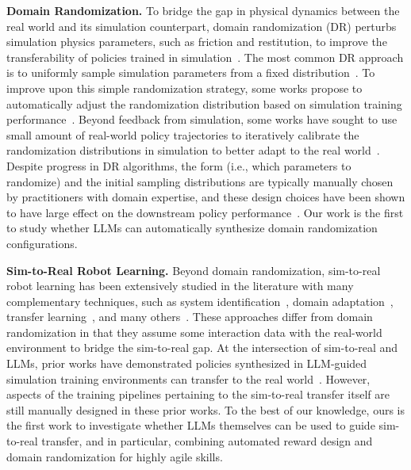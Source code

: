 \documentclass[conference]{IEEEtran}
\begin{document}
\textbf{Domain Randomization.} 
To bridge the gap in physical dynamics between the real world and its simulation counterpart, domain randomization (DR) perturbs simulation physics parameters, such as friction and restitution, to improve the transferability of policies trained in simulation~\citep{tobin2017domain,peng2018sim,muratore2022robot}. The most common DR approach is to uniformly sample simulation parameters from a fixed distribution~\citep{tobin2017domain,peng2018sim,andrychowicz2020learning, qi2023hand, kumar2021rma}. To improve upon this simple randomization strategy, some works propose to automatically adjust the randomization distribution based on simulation training performance~\citep{akkaya2019solving, handa2023dextreme, tiboni2023domain}. Beyond feedback from simulation, some works have sought to use small amount of real-world policy trajectories to iteratively calibrate the randomization distributions in simulation to better adapt to the real world~\citep{mehta2020active, ramos2019bayessim,chebotar2019closing, muratore2021data}. Despite progress in DR algorithms, the form (i.e., which parameters to randomize) and the initial sampling distributions are typically manually chosen by practitioners with domain expertise, and these design choices have been shown to have large effect on the downstream policy performance~\citep{vuong2019pick,xie2021dynamics}. Our work is the first to study whether LLMs can automatically synthesize domain randomization configurations. 

\textbf{Sim-to-Real Robot Learning.} Beyond domain randomization, sim-to-real robot learning has been extensively studied in the literature with many complementary techniques, such as system identification~\citep{aastrom1971system,yu2017preparing,tan2018sim}, domain adaptation~\citep{pinto2017robust,nagabandi2018learning,bousmalis2018using,james2019sim,ren2023adaptsim}, transfer learning~\citep{jaquier2023transfer}, and many others~\citep{muratore2022robot}. These approaches differ from domain randomization in that they assume some interaction data with the real-world environment to bridge the sim-to-real gap. At the intersection of sim-to-real and LLMs, prior works have demonstrated policies synthesized in LLM-guided simulation training environments can transfer to the real world~\citep{ha2023scaling,wang2023gensim,yu2023language,xie2023text2reward}. However, aspects of the training pipelines pertaining to the sim-to-real transfer itself are still manually designed in these prior works. To the best of our knowledge, ours is the first work to investigate whether LLMs themselves can be used to guide sim-to-real transfer, and in particular, combining automated reward design and domain randomization for highly agile skills. 
\end{document}
